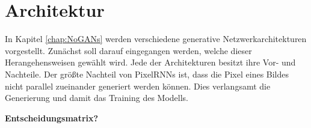 \section{Architektur}
In Kapitel \ref{chap:NoGANs} werden verschiedene generative Netzwerkarchitekturen vorgestellt. Zunächst soll darauf eingegangen werden, welche dieser Herangehensweisen gewählt wird. Jede der Architekturen besitzt ihre Vor- und Nachteile. Der größte Nachteil von \acp{PixelRNN} ist, dass die Pixel eines Bildes nicht parallel zueinander generiert werden können. Dies verlangsamt die Generierung und damit das Training des Modells.

\textbf{Entscheidungsmatrix?}

\cite{generative-models-comparison}
